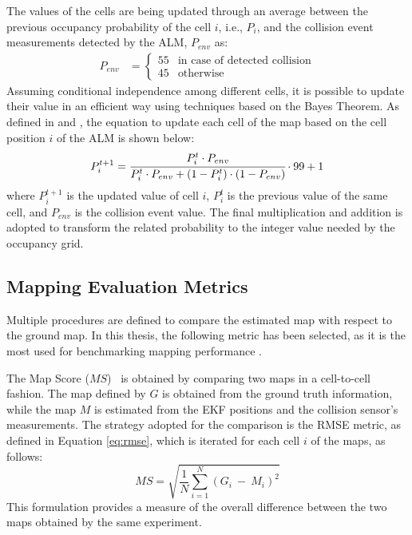 The values of the cells are being updated through an average between the previous occupancy probability of the cell $i$, i.e., $P_{i}$, and the collision event measurements detected by the \gls{ALM}, $P_{env}$ as:
\begin{align}
 P_{env} &=
  \begin{cases}
   55        & \text{in case of detected collision} \\
   45        & \text{otherwise}
  \end{cases}
\end{align}
Assuming conditional independence among different cells, it is possible to update their value in an efficient way using techniques based on the Bayes Theorem.
As defined in \cite{joubert2012adaptive} and \cite{singh_sonar_2019}, the equation to update each cell of the map based on the cell position $i$ of the \gls{ALM} is shown below:
\begin{equation}
    P_{i}^{t+1} = \cfrac{P_{i}^{t} \cdot P_{env}}{P_{i}^{t} \cdot P_{env} + (1-P_{i}^{t}) \cdot (1-P_{env})} \cdot 99 + 1
\end{equation}
where $P_{i}^{t+1}$ is the updated value of cell $i$, $P_{i}^{t}$ is the previous value of the same cell, and $P_{env}$ is the collision event value.
The final multiplication and addition is adopted to transform the related probability to the integer value needed by the occupancy grid.


\subsection{Mapping Evaluation Metrics}
\noindent Multiple procedures are defined to compare the estimated map with respect to the ground map.
In this thesis, the following metric has been selected, as it is the most used for benchmarking mapping performance \cite{baizid_vector_2016}. %

The Map Score ($MS$)~\cite{Martin1996RobotEG} is obtained by comparing two maps in a cell-to-cell fashion. 
The map defined by $G$ is obtained from the ground truth information, while the map $M$ is estimated from the \gls{EKF} positions and the collision sensor's measurements.
The strategy adopted for the comparison is the \gls{RMSE} metric, as defined in Equation \ref{eq:rmse}, which is iterated for each cell $i$ of the maps, as follows:
\begin{equation}
    MS = \sqrt{ \frac{1}{N}\sum_{i=1}^{N} (G_i~-~M_i)^2}
\end{equation}
This formulation provides a measure of the overall difference between the two maps obtained by the same experiment.

